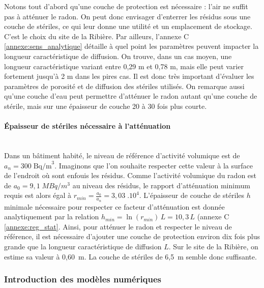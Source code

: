 \documentclass{article}
\begin{document}
Notons tout d’abord qu’une couche de protection est nécessaire : l’air ne suffit pas à atténuer le radon. On peut donc envisager d’enterrer les résidus sous une couche de stériles, ce qui leur donne une utilité et un emplacement de stockage. C'est le choix du site de la Ribière. Par ailleurs, l'annexe C \ref{annexe:sens_analytique} détaille à quel point les paramètres peuvent impacter la longueur caractéristique de diffusion. On trouve, dans un cas moyen, une longueur caractéristique variant entre 0,29 m et 0,78 m, mais elle peut varier fortement jusqu'à 2 m dans les pires cas. Il est donc très important d'évaluer les paramètres de porosité et de diffusion des stériles utilisés. On remarque aussi qu’une couche d’eau peut permettre d’atténuer le radon autant qu’une couche de stérile, mais sur une épaisseur de couche 20 à 30 fois plus courte.

\paragraph{Épaisseur de stériles nécessaire à l'atténuation \\ \\}
Dans un bâtiment habité, le niveau de référence d’activité volumique est de $a_n=300 \; \text{Bq/m}^3$. Imaginons que l’on souhaite respecter cette valeur à la surface de l’endroit où sont enfouis les résidus. Comme l'activité volumique du radon est de $a_0=9,1 \; M Bq/m^3$ au niveau des résidus, le rapport d’atténuation minimum requis est alors égal à $r_{min}=\frac{a_0}{a_n} =3,03 \; .10^4$. L’épaisseur de couche de stériles $h$ minimale nécessaire pour respecter ce facteur d’atténuation est donnée analytiquement par la relation $h_{min}=\ln(r_{min}) \,L =10,3 \,L $ (annexe C \ref{annexe:reg_stat}. Ainsi, pour atténuer le radon et respecter le niveau de référence, il est nécessaire d’ajouter une couche de protection environ dix fois plus grande que la longueur caractéristique de diffusion $L$. Sur le site de la Ribière, on estime sa valeur à 0,60~m. La couche de stériles de 6,5~m semble donc suffisante.

\subsubsection{Introduction des modèles numériques}
\end{document}
